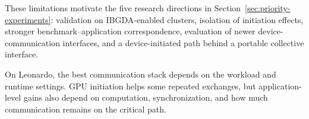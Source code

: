 These limitations motivate the five research directions in Section~\ref{sec:priority-experiments}: validation on IBGDA-enabled clusters, isolation of initiation effects, stronger benchmark--application correspondence, evaluation of newer device-communication interfaces, and a device-initiated path behind a portable collective interface.

\begin{keypoint}[Summary]
On Leonardo, the best communication stack depends on the workload and runtime settings. GPU initiation helps some repeated exchanges, but application-level gains also depend on computation, synchronization, and how much communication remains on the critical path.
\end{keypoint}
